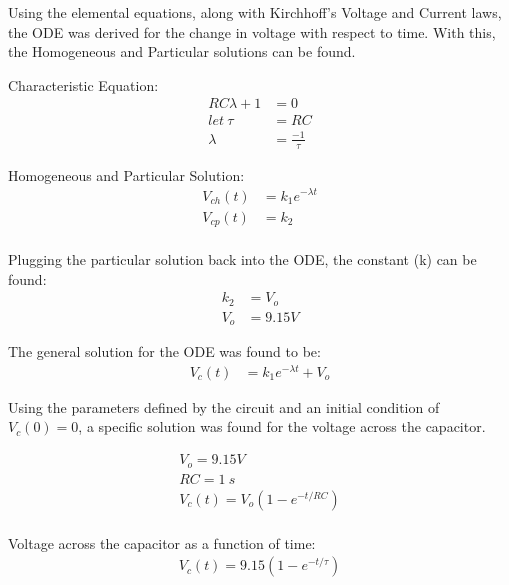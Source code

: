\documentclass[10pt,twocolumn]{article}
\begin{document}
Using the elemental equations, along with Kirchhoff's Voltage and Current laws, the ODE was derived for the change in voltage with respect to time. With this, the Homogeneous and Particular solutions can be found.


Characteristic Equation: 
\begin{equation} \label{eq4}
\begin{split}
RC\lambda+1&=0 \\
let  \  \tau&=RC\\
\lambda&=\frac{-1}{\tau}
\end{split}
\end{equation} 

Homogeneous and Particular Solution: 
\begin{equation} \label{eq5}
\begin{split}
V_{ch}(t)&=k_{1}e^{-\lambda t}\\
V_{cp}(t)&=k_2\\
\end{split}
\end{equation} 

Plugging the particular solution back into the ODE, the constant (k) can be found: 
\begin{equation} \label{eq6}
\begin{split}
k_2 &=V_{o} \\
V_{o}&= 9.15V
\end{split}
\end{equation}

The general solution for the ODE was found to be:
\begin{equation} \label{eq7}
\begin{split}
V_{c}(t)&=k_{1}e^{-\lambda t} + V_{o}
\end{split}
\end{equation} 

Using the parameters defined by the circuit and an initial condition of $V_{c}(0) = 0$, a specific solution was found for the voltage across the capacitor.

\begin{equation} \label{eq8}
\begin{split}
V_o=9.15V \\
RC = 1 \ s\\
V_{c}(t)=V_{o}(1-e^{-t/RC})\\
\end{split}
\end{equation}

Voltage across the capacitor as a function of time:
\begin{equation} \label{eq:final}
\begin{split}
V_{c}(t)=9.15(1-e^{-t/\tau})
\end{split}
\end{equation}






\end{document}
